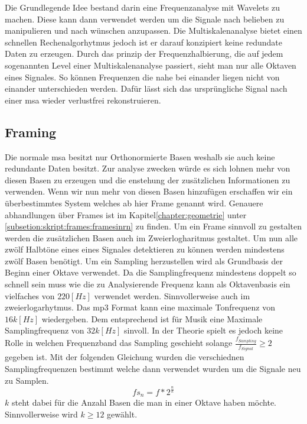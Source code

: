 



Die Grundlegende Idee bestand darin eine Frequenzanalyse mit Wavelets zu machen. Diese kann dann verwendet werden um die Signale nach belieben zu manipulieren und nach wünschen anzupassen. Die Multiskalenanalyse bietet einen schnellen Rechenalgorhytmus jedoch ist er darauf konzipiert keine redundate Daten zu erzeugen. Durch das prinzip der Frequenzhalbierung, die auf jedem sogenannten Level einer Multiskalenanalyse passiert, sieht man nur alle Oktaven eines Signales. So können Frequenzen die nahe bei einander liegen nicht von einander unterschieden werden. Dafür lässt sich das ursprüngliche Signal nach einer msa wieder verlustfrei rekonstruieren. 

\subsection{Framing}
Die normale msa besitzt nur Orthonormierte Basen weshalb sie auch keine redundante Daten besitzt. Zur analyse zwecken würde es sich lohnen mehr von diesen Basen zu erzeugen und die enstehung der zusätzlichen Informationen zu verwenden. Wenn wir nun mehr von diesen Basen hinzufügen erschaffen wir ein überbestimmtes System welches ab hier Frame genannt wird. Genauere abhandlungen über Frames ist im Kapitel\ref{chapter:geometrie} unter \ref{subsetion:skript:frames:framesinrn} zu finden. Um ein Frame sinnvoll zu gestalten werden die zusätzlichen Basen auch im Zweierlogharitmus gestaltet. Um nun alle zwölf Halbtöne eines eines Signales detektieren zu können werden mindestens zwölf Basen benötigt. Um ein Sampling herzustellen wird als Grundbasis der Beginn einer Oktave verwendet. Da die Samplingfrequenz mindestens doppelt so schnell sein muss wie die zu Analysierende Frequenz kann als Oktavenbasis ein vielfaches von $220[Hz]$ verwendet werden. Sinnvollerweise auch im zweierlogarhytmus. Das mp3 Format kann eine maximale Tonfrequenz von $16k[Hz]$ wiedergeben. Dem entsprechend ist für Musik eine Maximale Samplingfrequenz von $32k[Hz]$ sinvoll. In der Theorie spielt es jedoch keine Rolle in welchen Frequenzband das Sampling geschieht solange $\frac{f_{Sampling}}{f_{Signal}}\geq2$ gegeben ist. Mit der folgenden Gleichung wurden die verschiednen Samplingfrequenzen bestimmt welche dann verwendet wurden um die Signale neu zu Samplen. 
\begin{equation}
fs_{n}=f*2^{\frac{n}{k}}
\end{equation}
$k$ steht dabei für die Anzahl Basen die man in einer Oktave haben möchte. Sinnvollerweise wird $k \geq 12$ gewählt.\\

